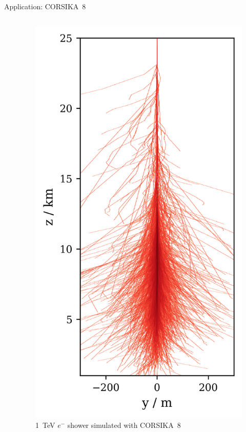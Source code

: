 \documentclass[t]{beamer}
\begin{document}
\begin{columns}[onlytextwidth]
\begin{column}{0.6\textwidth}
\begin{block}[equal height group=B]{Application: CORSIKA~8}
\begin{columns}[onlytextwidth]
\begin{column}{0.6\textwidth}
            \end{column}
            \begin{column}{0.4\textwidth}%
              \centering
              \begin{figure}
                \centering
                \includegraphics[width=0.75\linewidth, height=.4\textheight, keepaspectratio]{plots/shower.png}
                \caption*{\SI{1}{\tera\electronvolt} $e^-$ shower simulated with CORSIKA~8}
              \end{figure}
            \end{column}


\end{columns}
\end{block}
\end{column}
\end{columns}
\end{document}
